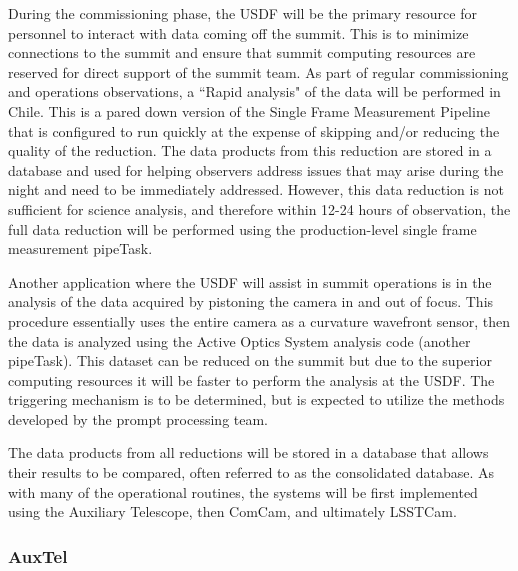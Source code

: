 \label{sec:commissioning_scope}
During the commissioning phase, the USDF will be the primary resource for personnel to interact with data coming off the summit. 
This is to minimize connections to the summit and ensure that summit computing resources are reserved for direct support of the summit team.
As part of regular commissioning and operations observations, a ``Rapid analysis" of the data will be performed in Chile.
This is a pared down version of the Single Frame Measurement Pipeline that is configured to run quickly at the expense of skipping and/or reducing the quality of the reduction. 
The data products from this reduction are stored in a database and used for helping observers address issues that may arise during the night and need to be immediately addressed. 
However, this data reduction is not sufficient for science analysis, and therefore within 12-24 hours of observation, the full data reduction will be performed using the production-level single frame measurement pipeTask. 

Another application where the USDF will assist in summit operations is in the analysis of the data acquired by pistoning the camera in and out of focus.
This procedure essentially uses the entire camera as a curvature wavefront sensor, then the data is analyzed using the Active Optics System analysis code (another pipeTask).
This dataset can be reduced on the summit but due to the superior computing resources it will be faster to perform the analysis at the USDF.
The triggering mechanism is to be determined, but is expected to utilize the methods developed by the prompt processing team.

The data products from all reductions will be stored in a database that allows their results to be compared, often referred to as the consolidated database.
As with many of the operational routines, the systems will be first implemented using the Auxiliary Telescope, then ComCam, and ultimately LSSTCam.

\subsubsection{AuxTel}

